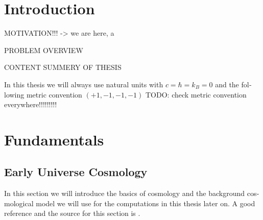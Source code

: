 \documentclass[master,       %
               twoside,        %
               BCOR10mm,       %
               english,ngerman, %
               ]{GAUBM}
\begin{document}
\begin{otherlanguage}{english}
\mainmatter   %

\chapter{Introduction}

MOTIVATION!!!
-> we are here, a

PROBLEM OVERVIEW

CONTENT SUMMERY OF THESIS

In this thesis we will always use natural units with $c = \hbar = k_B = 0$
and the following metric convention $(+1, -1, -1, -1)$
TODO: check metric convention everywhere!!!!!!!!!

\chapter{Fundamentals}

\section{Early Universe Cosmology}
In this section we will introduce the basics of cosmology and the background cosmological model we will use for the computations in this thesis later on.
A good reference and the source for this section is \cite{the_early_universe_kolb_and_turner}.


\end{otherlanguage}
\end{document}
